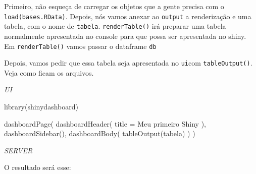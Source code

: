 \documentclass[
]{book}
\newenvironment{Shaded}{\begin{snugshade}}{\end{snugshade}}
\newcommand{\AttributeTok}[1]{\textcolor[rgb]{0.77,0.63,0.00}{#1}}
\newcommand{\CommentTok}[1]{\textcolor[rgb]{0.56,0.35,0.01}{\textit{#1}}}
\newcommand{\ControlFlowTok}[1]{\textcolor[rgb]{0.13,0.29,0.53}{\textbf{#1}}}
\newcommand{\FunctionTok}[1]{\textcolor[rgb]{0.00,0.00,0.00}{#1}}
\newcommand{\NormalTok}[1]{#1}
\newcommand{\OtherTok}[1]{\textcolor[rgb]{0.56,0.35,0.01}{#1}}
\newcommand{\SpecialCharTok}[1]{\textcolor[rgb]{0.00,0.00,0.00}{#1}}
\newcommand{\StringTok}[1]{\textcolor[rgb]{0.31,0.60,0.02}{#1}}
\begin{document}
Primeiro, não esqueça de carregar os objetos que a gente precisa com o \texttt{load(\textquotesingle{}bases.RData\textquotesingle{})}. Depois, nós vamos anexar ao \texttt{output} a renderização e uma tabela, com o nome de \texttt{tabela}. \texttt{renderTable()} irá preparar uma tabela normalmente apresentada no console para que possa ser apresentada no shiny. Em \texttt{renderTable()} vamos passar o dataframe \texttt{db}

Depois, vamos pedir que essa tabela seja apresentada no \texttt{ui}com \texttt{tableOutput()}. Veja como ficam os arquivos.

\emph{UI}

\begin{Shaded}
\begin{Highlighting}[]
\FunctionTok{library}\NormalTok{(shinydashboard)}

\FunctionTok{dashboardPage}\NormalTok{(}
  \FunctionTok{dashboardHeader}\NormalTok{(}
    \AttributeTok{title =} \StringTok{\textquotesingle{}Meu primeiro Shiny\textquotesingle{}}
\NormalTok{  ),}
  \FunctionTok{dashboardSidebar}\NormalTok{(),}
  \FunctionTok{dashboardBody}\NormalTok{(}
    \FunctionTok{tableOutput}\NormalTok{(}\StringTok{\textquotesingle{}tabela\textquotesingle{}}\NormalTok{)}
\NormalTok{  )}
\NormalTok{)}
\end{Highlighting}
\end{Shaded}

\emph{SERVER}

\begin{Shaded}
\end{Shaded}

O resultado será esse:
\end{document}
